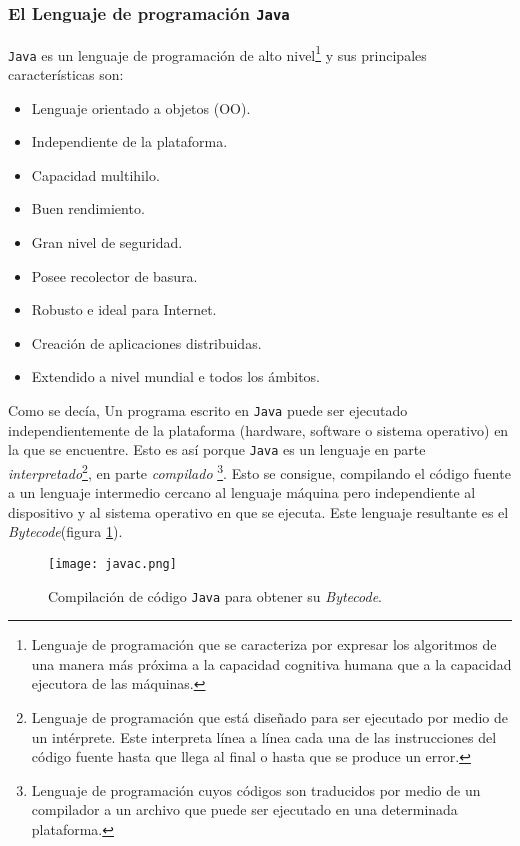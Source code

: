   \subsubsection{El Lenguaje de programación \texttt{Java}}
\texttt{Java} es un lenguaje de programación de alto nivel\footnote{Lenguaje
de programación que se caracteriza por expresar los algoritmos de una manera
más próxima a la capacidad cognitiva humana que a la capacidad ejecutora de
las máquinas.} y sus principales características son:
  \begin{itemize}
  \item Lenguaje orientado a objetos (\acs{OO}).
  \item Independiente de la plataforma.
  \item Capacidad multihilo.
  \item Buen rendimiento.
  \item Gran nivel de seguridad.
  \item Posee recolector de basura.
  \item Robusto e ideal para Internet.
  \item Creación de aplicaciones distribuidas.
  \item Extendido a nivel mundial e todos los ámbitos.
  \end{itemize}

Como se decía, Un programa escrito en \texttt{Java} puede ser ejecutado
independientemente de la plataforma (hardware, software o sistema operativo)
en la que se encuentre. Esto es así porque \texttt{Java} es un lenguaje en
parte \emph{interpretado}\footnote{Lenguaje de programación que está diseñado
para ser ejecutado por medio de un intérprete. Este interpreta línea
a línea cada una de las instrucciones del código fuente hasta que llega al
final o hasta que se produce un error.}, en parte \emph{compilado}
\footnote{Lenguaje de programación cuyos códigos son traducidos por medio de un 
compilador a un archivo que puede ser ejecutado en una determinada 
plataforma.}. Esto se consigue, compilando el código fuente a un lenguaje 
intermedio cercano al lenguaje máquina pero independiente al dispositivo y al 
sistema operativo en que se ejecuta. Este lenguaje resultante es el
\emph{Bytecode}(figura \ref{fig:javac}).

  \begin{figure}[H]
    \begin{center}
      \texttt{[image: javac.png]}
      \caption{Compilación de código \texttt{Java} para obtener su 
      \emph{Bytecode}.}
      \label{fig:javac}
    \end{center}
  \end{figure}

